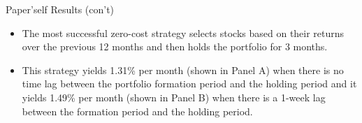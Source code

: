 \documentclass{beamer}
\begin{document}
\begin{frame}{Paper'self Results (con't)}
	\begin{itemize}
		\item The most successful zero-cost strategy selects stocks based on their returns over the previous 12 months and then holds the portfolio for 3 months.
		\item This strategy yields 1.31\% per month (shown in Panel A) when there is no time lag between the portfolio formation period and the holding period and it yields 1.49\% per month (shown in Panel B) when there is a 1-week lag between the formation period and the holding period.
	\end{itemize}
\end{frame}
\end{document}
